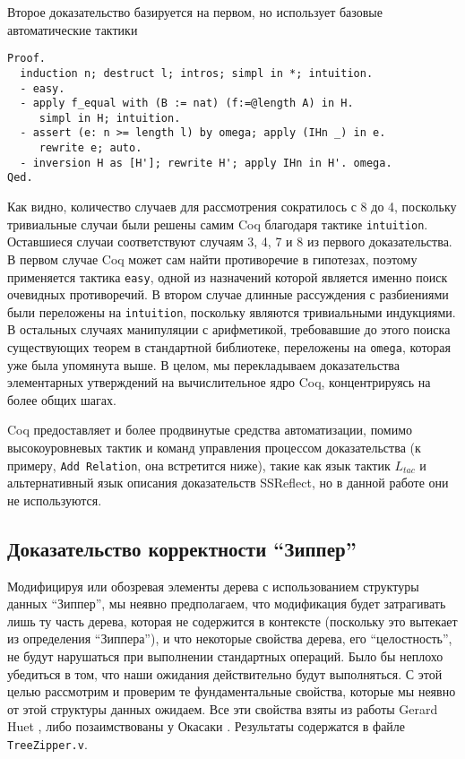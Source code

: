 Второе доказательство базируется на первом, но использует базовые автоматические тактики
\begin{lstlisting}
Proof.
  induction n; destruct l; intros; simpl in *; intuition.
  - easy.
  - apply f_equal with (B := nat) (f:=@length A) in H.
     simpl in H; intuition.
  - assert (e: n >= length l) by omega; apply (IHn _) in e.
     rewrite e; auto.
  - inversion H as [H']; rewrite H'; apply IHn in H'. omega.
Qed.
\end{lstlisting}

Как видно, количество случаев для рассмотрения сократилось с 8 до 4, поскольку тривиальные случаи были решены самим Coq благодаря тактике \texttt{intuition}.  Оставшиеся случаи соответствуют случаям 3, 4, 7 и 8 из первого доказательства. В первом случае Coq может сам найти противоречие в гипотезах, поэтому применяется тактика \texttt{easy}, одной из назначений которой является именно поиск очевидных противоречий. В втором случае длинные рассуждения с разбиениями были переложены на \texttt{intuition}, поскольку являются тривиальными индукциями. В остальных случаях манипуляции с арифметикой, требовавшие до этого поиска существующих теорем в стандартной библиотеке, переложены на \texttt{omega}, которая уже была упомянута выше. В целом, мы перекладываем доказательства элементарных утверждений на вычислительное ядро Coq, концентрируясь на более общих шагах.

Coq предоставляет и более продвинутые средства автоматизации, помимо высокоуровневых тактик и команд управления процессом доказательства (к примеру, \texttt{Add Relation}, она встретится ниже), такие как язык тактик $L_{tac}$ и альтернативный язык описания доказательств \textsf{SSReflect}, но в данной работе они не используются.

\subsection{Доказательство корректности ``Зиппер''}

Модифицируя или обозревая элементы дерева с использованием структуры данных ``Зиппер'', мы неявно предполагаем, что модификация будет затрагивать лишь ту часть дерева, которая не содержится в контексте (поскольку это вытекает из определения ``Зиппера''), и что некоторые свойства дерева, его ``целостность'', не будут нарушаться при выполнении стандартных операций. Было бы неплохо убедиться в том, что наши ожидания действительно будут выполняться. С этой целью рассмотрим и проверим те фундаментальные свойства, которые мы неявно от этой структуры данных ожидаем. Все эти свойства взяты из работы Gerard Huet \autocite{Huet1997}, либо позаимствованы у Окасаки \autocite{Okasaki1996}. Результаты содержатся в файле \texttt{TreeZipper.v}.

